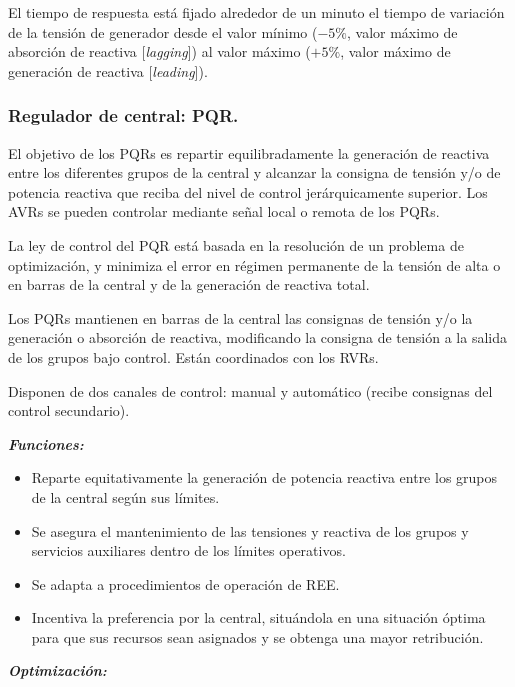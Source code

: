 			
			El tiempo de respuesta está fijado alrededor de un minuto el tiempo de variación de la tensión de generador desde el valor mínimo ($-5\%$, valor máximo de absorción de reactiva [\textit{lagging}]) al valor máximo ($+5\%$, valor máximo de generación de reactiva [\textit{leading}]).
			
			
			\subsubsection{Regulador de central: PQR.}
				El objetivo de los PQRs es repartir equilibradamente la generación de reactiva entre los diferentes grupos de la central y alcanzar la consigna de tensión y/o de potencia reactiva que reciba del nivel de control jerárquicamente superior. Los AVRs se pueden controlar mediante señal local o remota de los PQRs.
				
				
				La ley de control del PQR está basada en la resolución de un problema de optimización, y minimiza el error en régimen permanente de la tensión de alta o en barras de la central y de la generación de reactiva total.
				
				
				Los PQRs mantienen en barras de la central las consignas de tensión y/o la generación o absorción de reactiva, modificando la consigna de tensión a la salida de los grupos bajo control. Están coordinados con los RVRs.
				
				
				Disponen de dos canales de control: manual y automático (recibe consignas del control secundario).
				
				\vspace{0.25cm}
				\textit{\textbf{Funciones:}}
				\begin{itemize}
					\item Reparte equitativamente la generación de potencia reactiva entre los grupos de la central según sus límites.
					\item Se asegura el mantenimiento de las tensiones y reactiva de los grupos y servicios auxiliares dentro de los
					límites operativos.
					\item Se adapta a procedimientos de operación de REE.
					\item Incentiva la preferencia por la central, situándola en una situación óptima para que sus recursos sean
					asignados y se obtenga una mayor retribución.
				\end{itemize}
				
				
				\textbf{\textit{Optimización:}}
				
